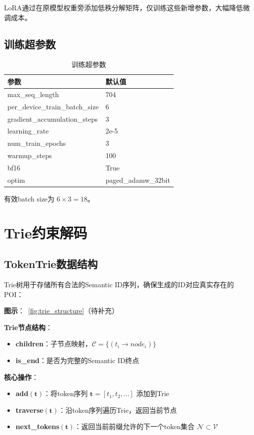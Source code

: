 LoRA通过在原模型权重旁添加低秩分解矩阵，仅训练这些新增参数，大幅降低微调成本。

\subsection{训练超参数}
\label{sec:training_params}

\begin{table}[htbp]
\centering
\caption{训练超参数}
\label{tab:training_params}
\begin{tabular}{ll}
\toprule
参数 & 默认值 \\
\midrule
max\_seq\_length & 704 \\
per\_device\_train\_batch\_size & 6 \\
gradient\_accumulation\_steps & 3 \\
learning\_rate & 2e-5 \\
num\_train\_epochs & 3 \\
warmup\_steps & 100 \\
bf16 & True \\
optim & paged\_adamw\_32bit \\
\bottomrule
\end{tabular}
\end{table}

有效batch size为 $6 \times 3 = 18$。

\section{Trie约束解码}
\label{sec:trie_decoding}

\subsection{TokenTrie数据结构}
\label{sec:trie_structure}

Trie树用于存储所有合法的Semantic ID序列，确保生成的ID对应真实存在的POI：

\textbf{图示}：\figurename~\ref{fig:trie_structure}（待补充）

\textbf{Trie节点结构}：
\begin{itemize}
    \item \textbf{children}：子节点映射，$\mathcal{C} = \{ (t_i \rightarrow node_i) \}$
    \item \textbf{is\_end}：是否为完整的Semantic ID终点
\end{itemize}

\textbf{核心操作}：
\begin{itemize}
    \item \textbf{add}$(\mathbf{t})$：将token序列 $\mathbf{t} = [t_1, t_2, \dots]$ 添加到Trie
    \item \textbf{traverse}$(\mathbf{t})$：沿token序列遍历Trie，返回当前节点
    \item \textbf{next\_tokens}$(\mathbf{t})$：返回当前前缀允许的下一个token集合 $\mathcal{N} \subset \mathcal{V}$
\end{itemize}

